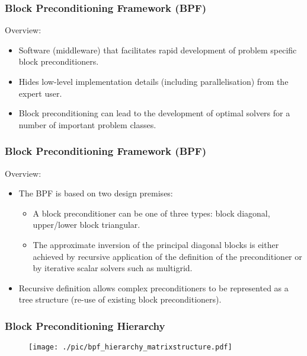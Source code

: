 \documentclass{beamer}
\begin{document}
\begin{frame} \frametitle{Block Preconditioning Framework (BPF)}
Overview:
\begin{itemize}
  \item Software (middleware) that facilitates rapid development of problem
    specific block preconditioners.
  \item Hides low-level implementation details (including parallelisation)
    from the expert user.
  \item Block preconditioning can lead to the development of optimal solvers
    for a number of important problem classes.

\end{itemize}
\end{frame}

\begin{frame} \frametitle{Block Preconditioning Framework (BPF)}
Overview:
\begin{itemize}
  \item The BPF is based on two design premises:
    \begin{itemize}
      \item A block preconditioner can be one of three types: block
        diagonal, upper/lower block triangular.
      \item The approximate inversion of the principal diagonal blocks is
        either achieved by recursive application of the definition of the
        preconditioner or by iterative scalar solvers such as multigrid. %
      \end{itemize}

  \item Recursive definition allows complex preconditioners to be
    represented as a tree structure (re-use of existing block
    preconditioners).
\end{itemize}
\end{frame}


\begin{frame} \frametitle{Block Preconditioning Hierarchy}
\begin{figure}[H]
    \centering
    \texttt{[image: ./pic/bpf\_hierarchy\_matrixstructure.pdf]}
\end{figure}
\end{frame}
\end{document}
